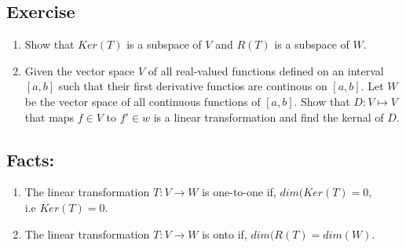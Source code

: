 \documentclass[aima104_lecturenotes_ku.tex]{subfiles}
\begin{document}
\subsection{Exercise}
\begin{enumerate}
\item Show that $Ker(T)$ is a subspace of $V$ and $R(T)$ is a subspace of $W$.
\item  Given the vector space $V$ of all real-valued functions defined on an interval $[a,b]$ such that their first derivative functios are continous on $[a,b]$. Let $W$ be the vector space of all continuous functions of $[a,b]$. Show that $D: V \mapsto V$ that maps $f \in V$ to $f' \in w$ is a linear transformation and find the kernal of $D$.
\end{enumerate}

\subsection{Facts:}
\begin{enumerate}
\item The linear transformation $T: V \to W$ is one-to-one if, $dim(Ker(T) = 0$, \\
  i.e $Ker(T) = {0}$.

\item The linear transformation $T: V \to W$ is onto if, $dim(R(T) = dim(W)$.

\end{enumerate}
\end{document}
